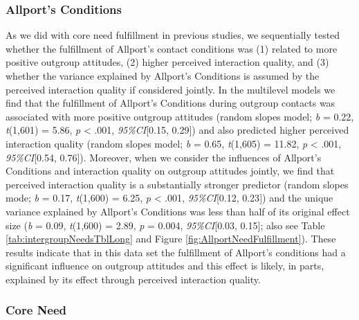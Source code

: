 \subsubsection{Allport's Conditions}

As we did with core need fulfillment in previous studies, we
sequentially tested whether the fulfillment of Allport's contact
conditions was (1) related to more positive outgroup attitudes, (2)
higher perceived interaction quality, and (3) whether the variance
explained by Allport's Conditions is assumed by the perceived
interaction quality if considered jointly. In the multilevel models we
find that the fulfillment of Allport's Conditions during outgroup
contacts was associated with more positive outgroup attitudes (random
slopes model; \textit{b} = 0.22, \textit{t}(1,601) = 5.86, \textit{p}
\textless{} .001, \textit{95\%CI}{[}0.15, 0.29{]}) and also predicted
higher perceived interaction quality (random slopes model; \textit{b} =
0.65, \textit{t}(1,605) = 11.82, \textit{p} \textless{} .001,
\textit{95\%CI}{[}0.54, 0.76{]}). Moreover, when we consider the
influences of Allport's Conditions and interaction quality on outgroup
attitudes jointly, we find that perceived interaction quality is a
substantially stronger predictor (random slopes mode; \textit{b} = 0.17,
\textit{t}(1,600) = 6.25, \textit{p} \textless{} .001,
\textit{95\%CI}{[}0.12, 0.23{]}) and the unique variance explained by
Allport's Conditions was less than half of its original effect size
(\textit{b} = 0.09, \textit{t}(1,600) = 2.89, \textit{p} = 0.004,
\textit{95\%CI}{[}0.03, 0.15{]}; also see Table
\ref{tab:intergroupNeedsTblLong} and Figure
\ref{fig:AllportNeedFulfillment}). These results indicate that in this
data set the fulfillment of Allport's conditions had a significant
influence on outgroup attitudes and this effect is likely, in parts,
explained by its effect through perceived interaction quality.

\subsubsection{Core Need}

